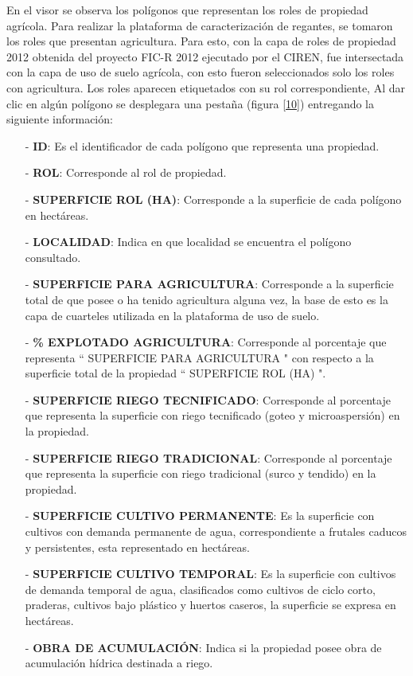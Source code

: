\documentclass[10pt]{article}
\begin{document}
En el visor se observa los polígonos que representan los roles de propiedad agrícola. Para realizar la plataforma de caracterización de regantes, se tomaron los roles que presentan agricultura. Para esto, con la capa de roles de propiedad 2012 obtenida del proyecto FIC-R 2012 ejecutado por el CIREN, fue intersectada con la capa de uso de suelo agrícola, con esto fueron seleccionados solo los roles con agricultura. Los roles aparecen etiquetados con su rol correspondiente, Al dar clic en algún polígono se desplegara una pestaña (figura \ref{10}) entregando la siguiente información:
\begin{itemize}
\item[-]\textbf{ID}: Es el identificador de cada polígono que representa una propiedad. 
\item[-]\textbf{ROL}: Corresponde al rol de propiedad.
\item[-]\textbf{SUPERFICIE ROL (HA)}: Corresponde a la superficie de cada polígono en hectáreas.
\item[-]\textbf{LOCALIDAD}: Indica en que localidad se encuentra el polígono consultado.
\item[-]\textbf{SUPERFICIE PARA AGRICULTURA}: Corresponde a la superficie total de que posee o ha tenido agricultura alguna vez, la base de esto es la capa de cuarteles utilizada en la plataforma de uso de suelo.
\item[-]\textbf{\% EXPLOTADO AGRICULTURA}: Corresponde al porcentaje que representa “ SUPERFICIE PARA AGRICULTURA " con respecto a la superficie total de la propiedad “ SUPERFICIE ROL (HA) ".
\item[-]\textbf{SUPERFICIE RIEGO TECNIFICADO}: Corresponde al porcentaje que representa la superficie con riego tecnificado (goteo y microaspersión) en la propiedad.
\item[-]\textbf{SUPERFICIE RIEGO TRADICIONAL}: Corresponde al porcentaje que representa la superficie con riego tradicional (surco y tendido) en la propiedad.
\item[-]\textbf{SUPERFICIE CULTIVO PERMANENTE}: Es la superficie con cultivos con demanda permanente de agua, correspondiente a frutales caducos y persistentes, esta representado en hectáreas.
\item[-]\textbf{SUPERFICIE CULTIVO TEMPORAL}: Es la superficie con cultivos de demanda temporal de agua, clasificados como cultivos de ciclo corto, praderas, cultivos bajo plástico y huertos caseros, la superficie se expresa en hectáreas.
\item[-]\textbf{OBRA DE ACUMULACIÓN}: Indica si la propiedad posee obra de acumulación hídrica destinada a riego. 

\end{itemize}
\end{document}
